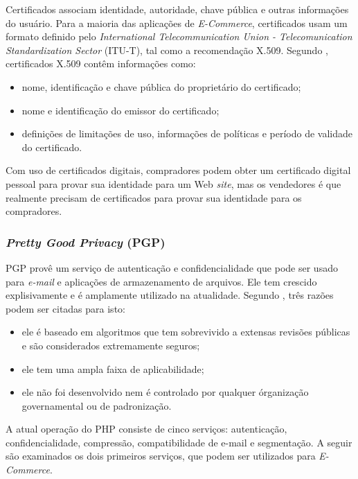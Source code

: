 Certificados associam identidade, autoridade, chave pública e outras informações do usuário. Para a maioria das aplicações de \textit{E-Commerce}, certificados usam um formato definido pelo \textit{International Telecommunication Union - Telecomunication Standardization Sector} (ITU-T), tal como a recomendação X.509. Segundo \cite{al2008commerce}, certificados X.509 contêm informações como:
\begin{itemize}
	\item nome, identificação e chave pública do proprietário do certificado;
	\item nome e identificação do emissor do certificado; 
	\item definições de limitações de uso, informações de políticas e período de validade do certificado.
\end{itemize}

Com uso de certificados digitais, compradores podem obter um certificado digital pessoal para provar sua identidade para um Web \textit{site}, mas os vendedores é que realmente precisam de certificados para provar sua identidade para os compradores.

\subsubsection{\textit{Pretty Good Privacy} (PGP)}

PGP provê um serviço de autenticação e confidencialidade que pode ser usado para \textit{e-mail} e aplicações de armazenamento de arquivos. Ele tem crescido explisivamente e é amplamente utilizado na atualidade. Segundo \cite{al2008commerce}, três razões podem ser citadas para isto:

\begin{itemize}
	\item ele é baseado em algoritmos que tem sobrevivido a extensas revisões públicas e são considerados extremamente seguros;
	\item ele tem uma ampla faixa de aplicabilidade;
	\item ele não foi desenvolvido nem é controlado por qualquer órganização governamental ou de padronização.
\end{itemize}

A atual operação do PHP consiste de cinco serviços: autenticação, confidencialidade, compressão, compatibilidade de e-mail e segmentação. A seguir são examinados os dois primeiros serviços, que podem ser utilizados para \textit{E-Commerce}.

